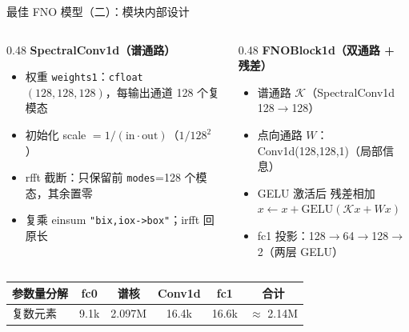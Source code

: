 \documentclass[aspectratio=169]{beamer}
\newcommand{\pos}[1]{\textcolor{blue!70!black}{#1}}
\begin{document}
\begin{frame}{最佳 FNO 模型（二）：模块内部设计}
  \begin{columns}[T]
    \begin{column}{0.48\textwidth}
      \textbf{SpectralConv1d（谱通路）}
      \begin{itemize}
        \item 权重 \texttt{weights1}：\texttt{cfloat} $(128,128,128)$，每输出通道 128 个复模态
        \item 初始化 \pos{scale $=1/(\text{in}\cdot\text{out})$}（$1/128^2$）
        \item \pos{rfft 截断}：只保留前 \texttt{modes}=128 个模态，其余置零
        \item 复乘 einsum \texttt{"bix,iox->box"}；irfft 回原长
      \end{itemize}
    \end{column}
    \begin{column}{0.48\textwidth}
      \textbf{FNOBlock1d（双通路 + 残差）}
      \begin{itemize}
        \item 谱通路 $\mathcal{K}$（SpectralConv1d 128$\to$128）
        \item 点向通路 $W$：Conv1d(128,128,1)（局部信息）
        \item GELU 激活后 \pos{残差相加} $x \leftarrow x + \mathrm{GELU}(\mathcal{K}x+Wx)$
        \item fc1 投影：128$\to$64$\to$128$\to$2（两层 GELU）
      \end{itemize}
    \end{column}
  \end{columns}
  \begin{table}
    \centering
    \small
    \begin{tabular}{lccccc}
      \toprule
      参数量分解 & fc0 & 谱核 & Conv1d & fc1 & 合计 \\
      \midrule
      复数元素 & 9.1k & \pos{2.097M} & 16.4k & 16.6k & $\approx$ \pos{2.14M} \\
      \bottomrule
    \end{tabular}
  \end{table}
\end{frame}
\end{document}
